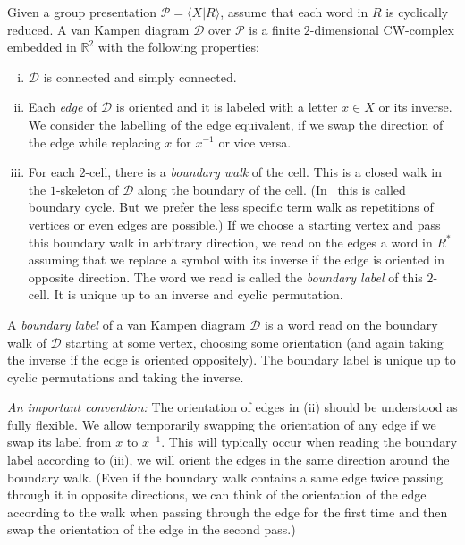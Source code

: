 \documentclass[10pt,a4paper]{article}
\theoremstyle{definition}
\theoremstyle{remark}
\newcommand{\R}{{\mathbb{R}}}
\newcommand\DD{\mathcal{D}}
\newcommand\PP{\mathcal{P}}
\begin{document}
Given a group presentation $\PP = \langle X | R\rangle$, assume that each word
in $R$ is cyclically reduced. A van Kampen diagram $\DD$ over $\PP$ is a finite
$2$-dimensional CW-complex embedded in $\R^2$ with the following properties:
\begin{enumerate}[(i)]
  \item $\DD$ is connected and simply connected.
  \item Each \emph{edge} of $\DD$ is oriented and it is labeled with a letter
    $x \in X$ or its inverse. We consider the labelling of the edge equivalent,
    if we swap the direction of the edge while replacing $x$ for $x^{-1}$ or
    vice versa.
  \item For each $2$-cell, there is a \emph{boundary walk} of the cell. This is
    a closed walk in the $1$-skeleton of $\DD$ along the boundary of the
    cell. (In~\cite{lyndon-schupp77} this is called boundary cycle. But we
    prefer the less specific term walk as repetitions of vertices or even edges are
    possible.)
    If we choose
    a starting vertex and pass this boundary walk in arbitrary direction, we
    read on the edges a word in $R^*$ assuming that we replace a symbol 
    with its inverse if the edge is oriented in opposite direction. The word we
    read is called the \emph{boundary label} of this $2$-cell. It is unique up to
    an inverse and cyclic permutation.
\end{enumerate}

A \emph{boundary label} of a van Kampen diagram $\DD$ is a word read
on the boundary walk of $\DD$ starting at some vertex, choosing some
orientation (and again taking the inverse if the edge is oriented oppositely).
The boundary label is unique up to cyclic permutations and taking the inverse.


\emph{An important convention:} The orientation of edges in (ii) should be
understood as fully flexible. We allow temporarily swapping the orientation of
any edge if we swap its label from $x$ to $x^{-1}$. This will typically occur
when reading the boundary label according to (iii), we will orient the edges in
the same direction around the boundary walk. (Even if the boundary walk
contains a same edge twice passing through it in opposite directions, we can
think of the orientation of the edge according to the walk when passing through
the edge for the first time and then swap the orientation of the edge in the
second pass.)
\end{document}

